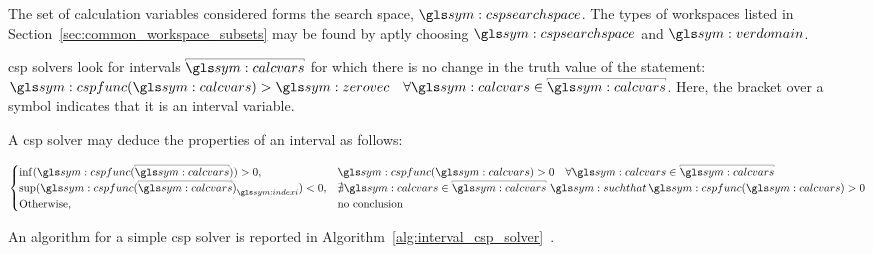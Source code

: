 				The set of calculation variables considered forms the search
				space, $\cspsearchspace$. The types of workspaces listed in
				Section~\ref{sec:common_workspace_subsets} may be found by aptly
				choosing $\cspsearchspace$ and $\verdomain$.


				\gls{csp} solvers look for intervals $\interval{\calcvars}$ for
				which there is no change in the truth value of the statement:
				\(
					\cspfunc(\calcvars)>\zerovec
						\quad\forall\calcvars\in\interval{\calcvars}
				\). Here, the bracket over a symbol indicates that it is an
				interval variable.

				A \gls{csp} solver may deduce the properties of an interval as
				follows:

				\begin{equation}
					\begin{cases}
						\inf(\cspfunc(\interval{\calcvars})) > 0, &
							\cspfunc(\calcvars) > 0
								\quad \forall\calcvars\in\interval{\calcvars}\\
						{\sup(\cspfunc(\interval{\calcvars})}_{\indexi}) < 0, &
							\nexists\calcvars\in\interval{\calcvars}\,\suchthat\,
								\cspfunc(\calcvars) > 0 \\
						\text{Otherwise}, & \text{no conclusion}
					\end{cases}
				\end{equation}

				An algorithm for a simple \gls{csp} solver is reported in
				Algorithm~\ref{alg:interval_csp_solver}~\cite{bib:cdpr:cable_driven_parallel_robots_theory_and_application}.

